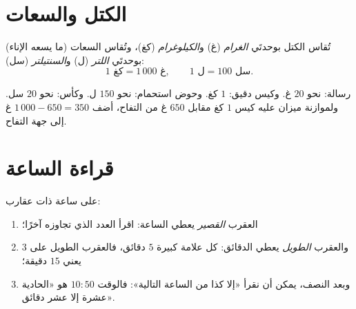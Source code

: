\section{الكتل والسعات}

\begin{definition}\label{def:g3:measure:mass}
تُقاس الكتل بوحدتَي \emph{الغرام} (غ) و\emph{الكيلوغرام} (كغ)،
وتُقاس السعات (ما يسعه الإناء) بوحدتَي \emph{اللتر} (ل)
و\emph{السنتيلتر} (سل):
\[
1 \text{ كغ} = 1\,000 \text{ غ},
\qquad
1 \text{ ل} = 100 \text{ سل}.
\]
\end{definition}

\begin{example}\label{ex:g3:measure:mass}
رسالة: نحو $20$ غ. وكيس دقيق: $1$ كغ. وحوض استحمام: نحو
$150$ ل. وكأس: نحو $20$ سل. ولموازنة ميزان عليه كيس
$1$ كغ مقابل $650$ غ من التفاح، أضف $1\,000 - 650 = 350$ غ إلى
جهة التفاح.
\end{example}

\section{قراءة الساعة}

\begin{method}\label{met:g3:measure:clock}
على ساعة ذات عقارب:
\begin{enumerate}
  \item العقرب \emph{القصير} يعطي الساعة: اقرأ العدد الذي
        تجاوزه آخرًا؛
  \item والعقرب \emph{الطويل} يعطي الدقائق: كل علامة كبيرة $5$
        دقائق، فالعقرب الطويل على $3$ يعني $15$ دقيقة؛
  \item وبعد النصف، يمكن أن نقرأ «إلا كذا من الساعة التالية»:
        فالوقت $10{:}50$ هو «الحادية عشرة إلا عشر دقائق».
\end{enumerate}
\end{method}

